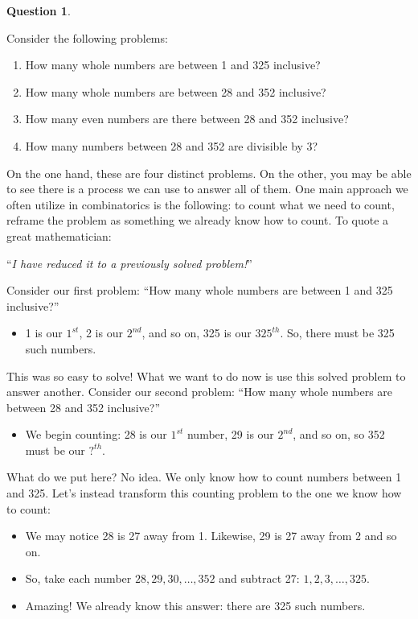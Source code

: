 \documentclass[openany]{book}
\theoremstyle{definition}
\newtheorem{question}[thm]{Question}
\begin{document}
\begin{question}\label{question1}\hfill

Consider the following problems:
    \begin{enumerate}
        \item How many whole numbers are between 1 and 325 inclusive?
        \item How many whole numbers are between 28 and 352 inclusive?   
        \item How many even numbers are there between 28 and 352 inclusive?
        \item How many numbers between 28 and 352 are divisible by 3?
    \end{enumerate}
\end{question}
On the one hand, these are four distinct problems. On the other, you may be able to see there is a process we can use to answer all of them. One main approach we often utilize in combinatorics is the
following: to count what we need to count, reframe the problem as something we already know how to count. To quote a great mathematician:
\begin{center}
    ``\emph{I have reduced it to a previously solved problem!}''
\end{center}
Consider our first problem: “How many whole numbers are between 1 and 325 inclusive?”
\begin{itemize}
    \item 1 is our $1^{st}$, 2 is our $2^{nd}$, and so on, 325 is our $325^{th}$. So, there must be 325 such numbers.
\end{itemize}
This was so easy to solve! What we want to do now is use this solved problem to answer another. Consider our second problem: “How many whole numbers are between 28 and 352 inclusive?”
\begin{itemize}
    \item We begin counting: 28 is our $1^{st}$ number, 29 is our $2^{nd}$, and so on, so 352 must be our $?^{th}$.
\end{itemize}
What do we put here? No idea. We only know how to count numbers between 1 and 325. Let's instead transform this counting problem to the one we know how to count:
\begin{itemize}
    \item We may notice 28 is 27 away from 1. Likewise, 29 is 27 away from 2 and so on.
    \item So, take each number $28,29,30,\dots, 352$ and subtract 27: $1,2,3,\dots, 325$.
    \item Amazing! We already know this answer: there are 325 such numbers. 
\end{itemize}
\end{document}
